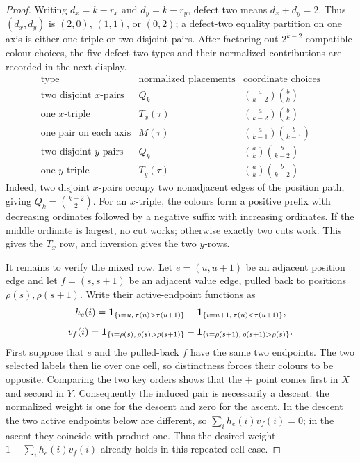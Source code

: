 \documentclass[11pt,letterpaper]{article}
\begin{document}
\begin{proof}
Writing $d_x=k-r_x$ and $d_y=k-r_y$, defect two means
$d_x+d_y=2$.  Thus $(d_x,d_y)$ is $(2,0)$, $(1,1)$, or $(0,2)$;
a defect-two equality partition on one axis is either one triple or two
disjoint pairs.  After factoring out $2^{k-2}$ compatible colour choices, the five
 defect-two types and their normalized contributions are recorded in the next display.
\[
\begin{array}{c|c|c}
\text{type}&\text{normalized placements}&\text{coordinate choices}\\ \hline
\text{two disjoint $x$-pairs}&Q_k&\binom a{k-2}\binom bk\\
\text{one $x$-triple}&T_x(\tau)&\binom a{k-2}\binom bk\\
\text{one pair on each axis}&M(\tau)&\binom a{k-1}\binom b{k-1}\\
\text{two disjoint $y$-pairs}&Q_k&\binom ak\binom b{k-2}\\
\text{one $y$-triple}&T_y(\tau)&\binom ak\binom b{k-2}
\end{array}
\]
Indeed, two disjoint $x$-pairs occupy two nonadjacent edges of the
position path, giving $Q_k=\binom{k-2}{2}$.  For an $x$-triple, the
colours form a positive prefix with decreasing ordinates followed by a
negative suffix with increasing ordinates.  If the middle ordinate is
largest, no cut works; otherwise exactly two cuts work.  This gives the
$T_x$ row, and inversion gives the two $y$-rows.

It remains to verify the mixed row.  Let $e=(u,u+1)$ be an adjacent
position edge and let $f=(s,s+1)$ be an adjacent value edge, pulled back to
positions $\rho(s),\rho(s+1)$.  Write their active-endpoint functions as
\[
 h_e(i)={\bf1}_{\{i=u,\,\tau(u)>\tau(u+1)\}}
        -{\bf1}_{\{i=u+1,\,\tau(u)<\tau(u+1)\}},
\]
\[
 v_f(i)={\bf1}_{\{i=\rho(s),\,\rho(s)>\rho(s+1)\}}
        -{\bf1}_{\{i=\rho(s+1),\,\rho(s+1)>\rho(s)\}}.
\]
First suppose that $e$ and the pulled-back
$f$ have the same two endpoints.  The two selected labels then lie over one
cell, so distinctness forces their colours to be opposite.  Comparing the two
key orders shows that the $+$ point comes first in $X$ and second in $Y$.
Consequently the induced pair is necessarily a descent: the normalized weight
is one for the descent and zero for the ascent.  In the descent the two active
endpoints below are different, so $\sum_i h_e(i)v_f(i)=0$; in the ascent they
coincide with product one.  Thus the desired weight
$1-\sum_i h_e(i)v_f(i)$ already holds in this repeated-cell case.


\end{proof}
\end{document}

